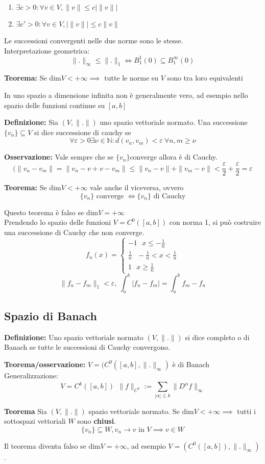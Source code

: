 \documentclass[a4paper]{article}
\newcommand{\N}{\mathbb{N}}
\begin{document}
\begin{enumerate}
	\item $\exists c>0:\forall v\in V,\|v\|\le c|\|v\||$
	\item $\exists c'>0:\forall v\in V,|\|v\||\le c\|v\|$
\end{enumerate}
Le successioni convergenti nelle due norme sono le stesse.
\\Interpretazione geometrica:
\[\|.\|_\infty\le \|.\|_1\iff B_1^1(0)\subseteq  B_1^\infty(0)\]
\begin{tcolorbox}
	\textbf{Teorema:} Se $\text{dim}V<+\infty\implies$ tutte le norme su $V$ sono tra loro equivalenti
\end{tcolorbox}
In uno spazio a dimensione infinita non è generalmente vero, ad esempio nello spazio delle funzioni continue su $[a,b]$
\begin{tcolorbox}
	\textbf{Definizione:} Sia $(V,\|.\|)$ uno spazio vettoriale normato. Una successione $\{v_n\} \subseteq V$ si dice successione di cauchy se 
	\[\forall \varepsilon>0 \exists \nu\in\N:d(v_n,v_m)<\varepsilon\ \forall n,m\ge \nu\]
\end{tcolorbox}
\textbf{Osservazione:} Vale sempre che se $\{v_n\} $converge allora è di Cauchy.
\[(\|v_n-v_m\|=\|v_n-v+v-v_m\|\le \|v_n-v\|+\|v_m-v\|<\frac{\varepsilon}{2}+\frac{\varepsilon}{2}=\varepsilon\]
\begin{tcolorbox}
	\textbf{Teorema:} Se $\text{dim}V<+\infty$ vale anche il viceversa, ovvero
	\[\{v_n\} \text{ converge }\iff \{v_n\} \text{ di Cauchy}\]
\end{tcolorbox}
Questo teorema è falso se $\text{dim}V=+\infty$
\\Prendendo lo spazio delle funzioni $V=C^0([a,b])$ con norma 1, si può costruire una successione di Cauchy che non converge.
\[f_n(x)=\begin{cases}
	-1\ \ \ x\le -\frac{1}{n}
	\\\frac{1}{n}\ \ \ -\frac{1}{n}<x<\frac{1}{n}
	\\1\ \ \ x\ge \frac{1}{n}
\end{cases}
\]
\[\|f_n-f_m\|_1<\varepsilon,\ \int_{a}^{b} |f_n-f_m|=\int_{a}^{b} f_m-f_n\]
\subsection{Spazio di Banach}
\begin{tcolorbox}
	\textbf{Definizione:} Uno spazio vettoriale normato $(V,\|.\|)$ si dice completo o di Banach se tutte le successioni di Cauchy convergono.
\end{tcolorbox}
\textbf{Teorema/osservazione: }$V=(C^0([a,b],\|.\|_\infty)$ è di Banach
\\Generalizzazione:
\[V=C^k([a,b])\ \ \|f\|_{C^k}:=\sum_{|\alpha|\le k}^{} \|D^\alpha f\|_\infty\]
\begin{tcolorbox}
	\textbf{Teorema} Sia $(V,\|.\|)$ spazio vettoriale normato. Se $\text{dim}V<+\infty\implies$ tutti i sottospazi vettoriali $W$ sono \textbf{chiusi}.
	\[\{v_n\} \subseteq  W,v_n\to v\text{ in }V\implies v\in W\]
\end{tcolorbox}
Il teorema diventa falso se $\text{dim}V=+\infty$, ad esempio $V=(C^0([a,b]), \|.\|_\infty)$.
\end{document}
